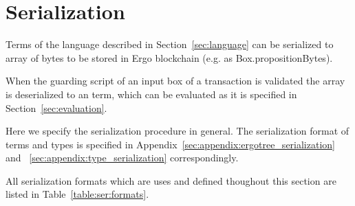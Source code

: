 \section{Serialization}
\label{sec:serialization}

Terms of the language described in Section~\ref{sec:language} can be
serialized to array of bytes to be stored in Ergo blockchain (e.g. as
Box.propositionBytes).

When the guarding script of an input box of a transaction is validated the
 array is deserialized to an \langname term, which can
be evaluated as it is specified in Section~\ref{sec:evaluation}.

Here we specify the serialization procedure in general. The serialization
format of \langname terms and types is specified in
Appendix~\ref{sec:appendix:ergotree_serialization} and
~\ref{sec:appendix:type_serialization} correspondingly. 

All serialization formats which are uses and defined thoughout this
section are listed in Table~\ref{table:ser:formats}.

